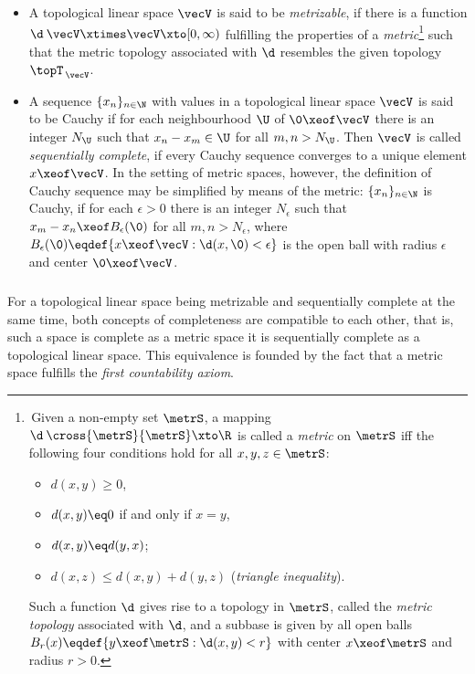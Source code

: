 \documentclass[11pt,twoside]{article}
\begin{document}
\begin{itemize}[leftmargin=12pt,itemsep=5pt]
\item[1.]
A topological linear space $\vecV$ is said to be \textit{metrizable},
if there is a function
$\d\:\vecV \xtimes \vecV \xto [0,\infty)$
fulfilling the properties of a \textit{metric}\footnote{
\,Given a non-empty set $\metrS$,
a mapping $\d\:\cross{\metrS}{\metrS} \xto \R$ is called a \textit{metric}
on $\metrS$
iff the following four conditions hold for all $x,y,z \in \metrS$:

\begin{itemize}[leftmargin=40pt,itemsep=0pt]
\item[(M-1)]
$d(x,y) \geq 0$,
\item[(M-2)]
$d(x,y) \eq 0$ if and only if $x=y$,
\item[(M-3)]
$d(x,y) \eq d(y,x)$;
\item[(M-4)]
$d(x,z) \leq d(x,y) + d(y,z)$ \hspace{3mm}(\textit{triangle inequality}).
\end{itemize}

Such a function $\d$ gives rise to a topology in $\metrS$,
called the \textit{metric topology} associated with $\d$,
and a subbase is given by all open balls
$B_r(x) \eqdef \{y \xeof \metrS: \d(x,y) < r\}$
with center $x \xeof \metrS$ and radius $r > 0$.
}
such that the metric topology associated with $\d$
resembles the given topology $\topT_{\,\vecV}$.

\item[2.]
A sequence $\{x_n\}_{n \in \N}$ with values
in a topological linear space $\vecV$ is said to be Cauchy
if for each neighbourhood $\U$ of $\0 \xeof \vecV$
there is an integer $N_{\U}$
such that $x_n - x_m \in \U$ for all $m,n > N_{\U}$.
Then $\vecV$ is called \textit{sequentially complete},
if every Cauchy sequence converges to a unique element $x \xeof \vecV$.
In the setting of metric spaces,
however,
the definition of Cauchy sequence may be simplified by means of the metric:
$\{x_n\}_{n \in \N}$ is Cauchy,
if for each $\epsilon > 0$ there is an integer $N_{\epsilon}$ 
such that
$x_m - x_n \xeof B_{\epsilon}(\0)$ for all $m,n > N_{\epsilon}$,
where $B_{\epsilon}(\0) \eqdef \{x \xeof \vecV: \d(x,\0) < \epsilon\}$
is the open ball with radius $\epsilon$ and center $\0 \xeof \vecV$.
\end{itemize}

\subparagraph{}
For a topological linear space being metrizable and sequentially complete
at the same time,
both concepts of completeness are compatible to each other,
that is,
such a space is complete as a metric space
\iff
it is sequentially complete as a topological linear space.
This equivalence is founded by the fact
that a metric space fulfills the \textit{first countability axiom}.
\end{document}
